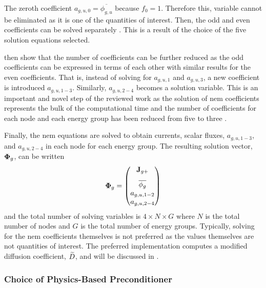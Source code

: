       The zeroth coefficient $a_{g,u,0} = \overline{\phi_{g,u}}$ because $f_0 =
      1$. Therefore this, variable cannot be eliminated as it is one of the
      quantities of interest. Then, the odd and even coefficients can be solved
      separately \cite{gehinThesis}. This is a result of the choice of the five
      solution equations selected. 

      \citeauthor{qe2paper} then show that the number of coefficients can be
      further reduced as the odd coefficients can be expressed in terms of
      each other with similar results for the even coefficients. That is,
      instead of solving for $a_{g,u,1}$ and $a_{g,u,3}$, a new coefficient is
      introduced $a_{g,u,1-3}$. Similarly, $a_{g,u,2-4}$ becomes a solution
      variable. This is an important and novel step of the reviewed work as the
      solution of \gls{nem} coefficients represents the bulk of the
      computational time and the number of coefficients for each node and each
      energy group has been reduced from five to three
      \cite{qe2paper}.

      Finally, the \gls{nem} equations are solved to obtain currents, scalar
      fluxes, $a_{g,u,1-3}$, and $a_{g,u,2-4}$ in each node for each energy
      group. The resulting solution vector, $\mathbf{\Phi}_g$, can be written 
      \begin{equation}
        \label{eq:solution_vector}
        \vPhi_g =
        \begin{pmatrix}
          \vspace{8pt}
          \current_{g+} \\
          \overline{\phi_g} \\
          a_{g,u,1-2} \\
          a_{g,u,2-4}
        \end{pmatrix}
      \end{equation}
      and the total number of solving variables is $4 \times N \times G$ where
      $N$ is the total number of nodes and $G$ is the total number of energy
      groups. Typically, solving for the \gls{nem} coefficients themselves is
      not preferred as the values themselves are not quantities of interest.
      The preferred implementation computes a modified diffusion coefficient,
      $\widetilde{D}$, and will be discussed in .

    \subsubsection{Choice of Physics-Based Preconditioner}

